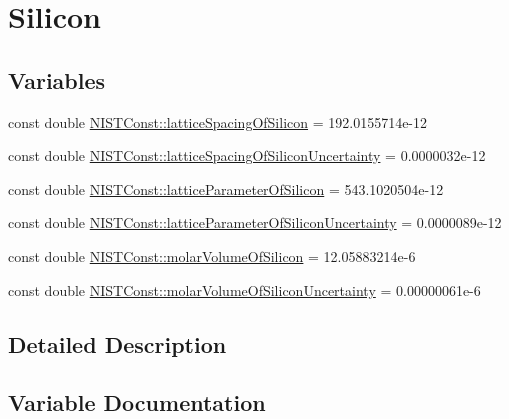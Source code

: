 \hypertarget{group___n_i_s_t_const-_silicon}{}\section{Silicon}
\label{group___n_i_s_t_const-_silicon}
\subsection*{Variables}
\begin{DoxyCompactItemize}
\item 
const double \hyperlink{group___n_i_s_t_const-_silicon_ga439c53134da8a910d17c996b136da7a8}{N\+I\+S\+T\+Const\+::lattice\+Spacing\+Of\+Silicon} = 192.\+0155714e-\/12
\item 
const double \hyperlink{group___n_i_s_t_const-_silicon_ga0f426756bd67207acf22b7ebc224abec}{N\+I\+S\+T\+Const\+::lattice\+Spacing\+Of\+Silicon\+Uncertainty} = 0.\+0000032e-\/12
\item 
const double \hyperlink{group___n_i_s_t_const-_silicon_ga8ab64e0d4d7e0ebde43f1dd5f4ff68bf}{N\+I\+S\+T\+Const\+::lattice\+Parameter\+Of\+Silicon} = 543.\+1020504e-\/12
\item 
const double \hyperlink{group___n_i_s_t_const-_silicon_ga4ced8c2e5ea89443bad8360b0a822660}{N\+I\+S\+T\+Const\+::lattice\+Parameter\+Of\+Silicon\+Uncertainty} = 0.\+0000089e-\/12
\item 
const double \hyperlink{group___n_i_s_t_const-_silicon_gaf084f6d4668f778d204cd782269f082c}{N\+I\+S\+T\+Const\+::molar\+Volume\+Of\+Silicon} = 12.\+05883214e-\/6
\item 
const double \hyperlink{group___n_i_s_t_const-_silicon_ga35b10008977416da18242a7e7808fc0d}{N\+I\+S\+T\+Const\+::molar\+Volume\+Of\+Silicon\+Uncertainty} = 0.\+00000061e-\/6
\end{DoxyCompactItemize}


\subsection{Detailed Description}


\subsection{Variable Documentation}
\mbox{\label{group___n_i_s_t_const-_silicon_ga8ab64e0d4d7e0ebde43f1dd5f4ff68bf}} 
